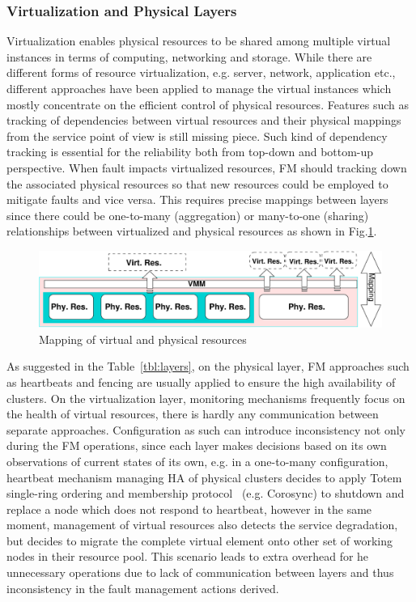 \subsubsection{Virtualization and Physical Layers}

Virtualization enables physical resources to be shared among multiple virtual
instances in terms of computing, networking and storage. While there are
different forms of resource virtualization, e.g. server, network, application
etc., different approaches have been applied to manage the virtual instances
which mostly concentrate on the efficient control of physical resources.
Features such as tracking of dependencies between virtual resources and their
physical mappings from the service point of view is still missing piece. Such kind
of dependency tracking is essential for the reliability both from top-down and
bottom-up perspective. When fault impacts virtualized resources, FM should
tracking down the associated physical resources so that new resources could be
employed to mitigate faults and vice versa. This requires precise mappings
between layers since there could be one-to-many (aggregation) or many-to-one
(sharing) relationships between virtualized and physical resources as shown in
Fig.\ref{fig:mapping}.  
 
\begin{figure}[ht]
	\centering
	\includegraphics[scale=0.52]{fig/mapping.pdf}
	\caption{Mapping of virtual and physical resources}
	\label{fig:mapping}
\end{figure}

As suggested in the Table~\ref{tbl:layers}, on the physical layer, FM approaches
such as heartbeats and fencing are usually applied to ensure the high
availability of clusters. On the virtualization layer, monitoring mechanisms
frequently focus on the health of virtual resources, there is hardly any
communication between separate approaches. Configuration as such can introduce
inconsistency not only during the FM operations, since each layer makes
decisions based on its own observations of current states of its own, e.g.  in a
one-to-many configuration, heartbeat mechanism managing HA of physical clusters
decides to apply Totem single-ring ordering and membership
protocol~\cite{amir1995totem} (e.g. Corosync) to shutdown and replace a node
which does not respond to heartbeat, however in the same moment, management of
virtual resources also detects the service degradation, but decides to migrate
the complete virtual element onto other set of working nodes in their resource
pool. This scenario leads to extra overhead for he unnecessary operations due to
lack of communication between layers and thus inconsistency in the fault
management actions derived.
 
